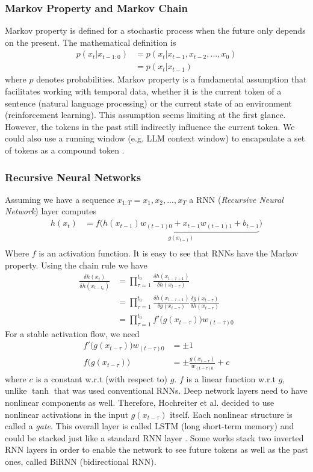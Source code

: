 \documentclass{article}
\begin{document}
\subsubsection{Markov Property and Markov Chain}
Markov property is defined for a stochastic process when the future only depends on the present. The mathematical definition is
\begin{align}
    p(x_t|x_{t-1:0}) &= p(x_t|x_{t-1},x_{t-2},...,x_0)\\
    &= p(x_t|x_{t-1})
\end{align}
where $p$ denotes probabilities. Markov property is a fundamental assumption that facilitates working with temporal data, whether it is the current token of a sentence (natural language processing) or the current state of an environment (reinforcement learning). This assumption seems limiting at the first glance. However, the tokens in the past still indirectly influence the current token. We could also use a running window (e.g. LLM context window) to encapsulate a set of tokens as a compound token \cite{karaca_ai-book_2024}.
\subsubsection{Recursive Neural Networks}
Assuming we have a sequence $x_{1:T} = x_1, x_2, ..., x_T$ a RNN (\textit{Recursive Neural Network}) layer computes 
\begin{align}
    h(x_t) &= f\big(\underbrace{h(x_{t-1})w_{(t-1)0} + x_{t-1}w_{(t-1)1} + b_{t-1}}_{g(x_{t-1})}\big)\\
\end{align}
Where $f$ is an activation function. It is easy to see that RNNs have the Markov property. Using the chain rule we have
\begin{align}
    \frac{\delta h(x_t)}{\delta h(x_{t-t_0})} 
    &= \prod_{\tau=1}^{t_0}\frac{\delta h(x_{t-\tau+1})}{\delta h(x_{t-\tau})}\\
    &= \prod_{\tau=1}^{t_0}\frac{\delta h(x_{t-\tau+1})}{\delta g(x_{t-\tau})}\frac{\delta g(x_{t-\tau})}{\delta h(x_{t-\tau})}\\
    &= \prod_{\tau=1}^{t_0}f'\Big(g(x_{t-\tau})\Big)w_{(t-\tau)0}
\end{align}
For a stable activation flow, we need 
\begin{align}
    f'\Big(g(x_{t-\tau})\Big)w_{(t-\tau)0} &= \pm 1\\
    f\Big(g(x_{t-\tau})\Big) &= \pm \frac{g(x_{t-\tau})}{w_{(t-\tau)0}} + c
\end{align}
where $c$ is a constant w.r.t (with respect to) $g$. $f$ is a linear function w.r.t $g$, unlike $\tanh$ that was used conventional RNNs. Deep network layers need to have nonlinear components as well. Therefore, Hochreiter et al. decided to use nonlinear activations in the input $g(x_{t-\tau})$ itself. Each nonlinear structure is called a \textit{gate}. This overall layer is called LSTM (long short-term memory) and could be stacked just like a standard RNN layer \cite{hochreiter_long_1997}. Some works stack two inverted RNN layers in order to enable the network to see future tokens as well as the past ones, called BiRNN (bidirectional RNN).
\end{document}
